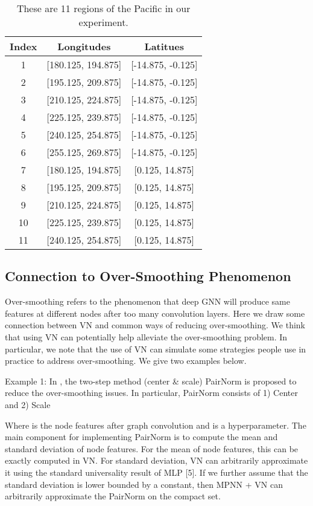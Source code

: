 \documentclass[nohyperref]{article}
\theoremstyle{plain}
\theoremstyle{definition}
\theoremstyle{remark}
\begin{document}
\begin{table}
\caption{\label{tab:Pacific-regions} These are 11 regions of the Pacific in our experiment.}
\begin{center}
\begin{tabular}{ccc}
\toprule
\textbf{Index} & \textbf{Longitudes} & \textbf{Latitues} \\
\midrule
1 & [180.125, 194.875] & [-14.875, -0.125] \\
2 & [195.125, 209.875] & [-14.875, -0.125] \\
3 & [210.125, 224.875] & [-14.875, -0.125] \\
4 & [225.125, 239.875] & [-14.875, -0.125] \\
5 & [240.125, 254.875] & [-14.875, -0.125] \\
6 & [255.125, 269.875] & [-14.875, -0.125] \\
7 & [180.125, 194.875] & [0.125, 14.875] \\
8 & [195.125, 209.875] & [0.125, 14.875] \\
9 & [210.125, 224.875] & [0.125, 14.875] \\
10 & [225.125, 239.875] & [0.125, 14.875] \\
11 & [240.125, 254.875] & [0.125, 14.875] \\
\bottomrule
\end{tabular}
\end{center}
\end{table}


\subsection{Connection to Over-Smoothing Phenomenon}
\label{subsec:over-smoothing}
Over-smoothing refers to the phenomenon that deep GNN will produce same features at different nodes after too many convolution layers. Here we draw some connection between VN and common ways of reducing over-smoothing. We think that using VN can potentially help alleviate the over-smoothing problem. In particular, we note that the use of VN can simulate some strategies people use in practice to address over-smoothing. We give two examples below. 

Example 1: In \cite{zhao2019pairnorm}, the two-step method (center \& scale) PairNorm is proposed to reduce the over-smoothing issues. In particular, PairNorm consists of 1) Center and 2) Scale






Where  is the node features after graph convolution and  is a hyperparameter. The main component for implementing PairNorm is to compute the mean and standard deviation of node features. For the mean of node features, this can be exactly computed in VN. For standard deviation, VN can arbitrarily approximate it using the standard universality result of MLP [5]. If we further assume that the standard deviation is lower bounded by a constant, then MPNN + VN can arbitrarily approximate the PairNorm on the compact set. 
\end{document}
